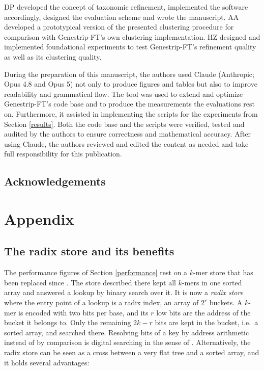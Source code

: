 \documentclass[pdflatex,sn-vancouver-num]{sn-jnl}
\begin{document}
DP developed the concept of taxonomic refinement, implemented the software accordingly, designed the evaluation scheme and wrote the manuscript. AA developed a prototypical version of the presented clustering procedure for comparison with Genestrip-FT's own clustering implementation. HZ designed and implemented foundational experiments to test Genestrip-FT's refinement quality as well as its clustering quality.

During the preparation of this manuscript, the authors used Claude (Anthropic; Opus 4.8 and Opus 5) not only to produce figures and tables but also to improve readability and grammatical flow.
The tool was used to extend and optimize Genestrip-FT's code base and to produce the measurements the evaluations rest on. Furthermore, it assisted in implementing the scripts for the experiments from Section \ref{results}. Both the code base and the scripts were verified, tested and audited by the authors to ensure correctness and mathematical accuracy. After using Claude, the authors reviewed and edited the content as needed and take full responsibility for this publication.

\subsection{Acknowledgements}

\section{Appendix}

\subsection{The radix store and its benefits}\label{radixstore}

The performance figures of Section \ref{performance} rest on a $k$-mer store that has been replaced since \citep{genestrip-pub}. The store described there kept all $k$-mers in one sorted array and answered a lookup by binary search over it. It is now a \emph{radix store} where the entry point of a lookup is a radix index, an array of $2^{r}$ buckets. A $k$-mer is encoded with two bits per base, and its $r$ low bits are the address of the bucket it belongs to. Only the remaining $2k - r$ bits are kept in the bucket, i.e.\ a sorted array, and searched there. Resolving bits of a key by address arithmetic instead of by comparison is digital searching in the sense of \citet{knuthtaocp3}. Alternatively, the radix store can be seen as a cross between a very flat tree and a sorted array, and it holds several advantages:
\end{document}
